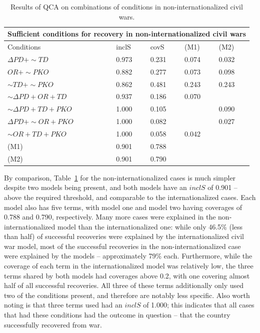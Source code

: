 \documentclass{article}
\begin{document}
\begin{table}[ht]
    \centering
    \small
    \begin{tabular}{p{5cm} p{1.5cm} p{1.5cm} p{1.5cm} p{1.5cm}}
        \hline
        \multicolumn{5}{c}{Sufficient conditions for recovery in non-internationalized civil wars} \\
        \hline
        Conditions & inclS & covS & (M1) & (M2) \\
        \hline
        $\Delta PD + \sim TD$ & 0.973 & 0.231 & 0.074 & 0.032 \\
        $OR + \sim PKO$ & 0.882 & 0.277 & 0.073 & 0.098 \\[6pt]
        $\sim TD + \sim PKO$ & 0.862 & 0.481 & 0.243 & 0.243 \\
        \hline
        $\sim\Delta PD + OR + TD$ & 0.937 & 0.186 & 0.070 & \\
        $\sim\Delta PD + TD + PKO$ & 1.000 & 0.105 & & 0.090\\
        $\Delta PD + \sim OR + PKO$ & 1.000 & 0.082 & & 0.027\\
        $\sim OR + TD + PKO$ & 1.000 & 0.058 & 0.042 &\\
        \hline
        (M1) & 0.901 & 0.788 & & \\
        (M2) & 0.901 & 0.790 & & \\
        \hline
    \end{tabular}
    \caption{Results of QCA on combinations of conditions in non-internationalized civil wars.}
    \label{tab:sufficiency-nonintl}
\end{table}

By comparison, Table~\ref{tab:sufficiency-nonintl} for the non-internationalized cases is much simpler despite two models being present, and both models have an $inclS$ of 0.901 -- above the required threshold, and comparable to the internationalized cases. Each model also has five terms, with model one and model two having coverages of 0.788 and 0.790, respectively. Many more cases were explained in the non-internationalized model than the internationalized one: while only 46.5\% (less than half) of successful recoveries were explained by the internationalized civil war model, most of the successful recoveries in the non-internationalized case were explained by the models -- approximately 79\% each. Furthermore, while the coverage of each term in the internationalized model was relatively low, the three terms shared by both models had coverages above 0.2, with one covering almost half of all successful recoveries. All three of these terms additionally only used two of the conditions present, and therefore are notably less specific. Also worth noting is that three terms used had an $inclS$ of 1.000; this indicates that all cases that had these conditions had the outcome in question -- that the country successfully recovered from war.
\end{document}

